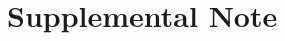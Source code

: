 \documentclass[../main.tex]{subfiles}
\begin{document}
\section{Supplemental Note}

\blindtext
\end{document}
